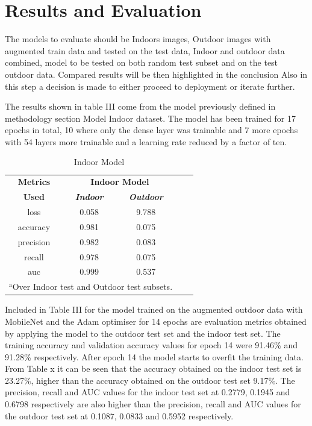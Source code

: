 \documentclass[conference]{IEEEtran}
\begin{document}
\section{Results and Evaluation}


The models to evaluate should be Indoors images, Outdoor images with augmented train data and tested on the test data, Indoor and outdoor data combined, model to be tested on both random test subset and on the test outdoor data. Compared results will be then highlighted in the conclusion 
Also in this step a decision is made to either proceed to deployment or iterate further. 

The results shown in table III come from the model previously defined in methodology section Model Indoor dataset.  The model has been trained for 17 epochs in total, 10 where only the dense layer was trainable and 7 more epochs with 54 layers more trainable and a learning rate reduced by a factor of ten.  

\begin{table}[htbp]
\caption{Indoor Model}
\begin{center}
\begin{tabular}{|c|c|c|c|c|}
\hline
\textbf{Metrics}&\multicolumn{2}{|c|}{\textbf{Indoor Model}} \\
\cline{2-3} 
\textbf{Used} & \textbf{\textit{Indoor}}& \textbf{\textit{Outdoor}} \\
\hline
loss &0.058&9.788  \\
\hline
accuracy &0.981&0.075 \\
\hline
precision &0.982&0.083 \\
\hline
recall &0.978&0.075 \\
\hline
auc &0.999&0.537  \\
\hline
\multicolumn{3}{l}{$^{\mathrm{a}}$Over Indoor test and Outdoor test subsets.}
\end{tabular}
\label{tab1}
\end{center}
\end{table}

Included in Table III for the model trained on the augmented outdoor data with MobileNet and the Adam optimiser for 14 epochs are evaluation metrics obtained by applying the model to the outdoor test set and the indoor test set. The training accuracy and validation accuracy values for epoch 14 were 91.46\% and 91.28\% respectively. After epoch 14 the model starts to overfit the training data. From Table x it can be seen that the accuracy obtained on the indoor test set is 23.27\%, higher than the accuracy obtained on the outdoor test set 9.17\%. The precision, recall and AUC values for the indoor test set at 0.2779, 0.1945 and 0.6798 respectively are also higher than the precision, recall and AUC values for the outdoor test set at  0.1087, 0.0833 and 0.5952 respectively. 
\end{document}
